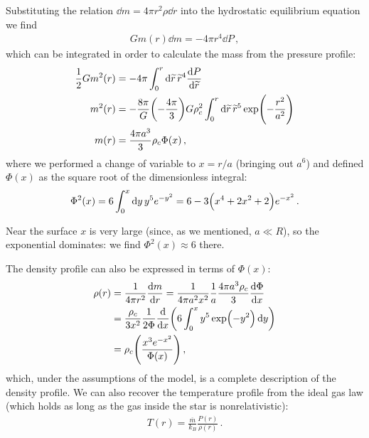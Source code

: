 \documentclass[main.tex]{subfiles}
\begin{document}
Substituting the relation \(\dd{m} = 4 \pi r^2\rho \dd{r}\) into the hydrostatic equilibrium equation we find
%
\begin{align}
  G m(r) \dd{m} = - 4 \pi r^{4} \dd{P}
\,,
\end{align}
%
which can be integrated in order to calculate the mass from the pressure profile: 
%
\begin{align}
  \frac{1}{2} G m^2(r) &= - 4 \pi \int_{0}^{r} \dd{\widetilde{r}} \widetilde{r}^{4} \dv{P}{\widetilde{r}} \\
  m^2(r) &= - \frac{8 \pi }{G} \qty(- \frac{4 \pi }{3}) G \rho_c^2 \int_{0}^{r} \dd{\widetilde{r}} \widetilde{r}^{5} \exp(- \frac{r^2}{a^2})\\
  m(r) &=  \frac{4 \pi a^3}{3} \rho_c \Phi (x)
\,,
\end{align}
%
where we performed a change of variable to \(x = r/a\) (bringing out \(a^{6}\)) and defined \(\Phi (x)\) as the square root of the dimensionless integral: 
%
\begin{align}
  \Phi^2 (x) = 6 \int_{0}^{x} \dd{y} y^{5} e^{-y^2} 
  = 6 - 3 \qty(x^4 +2 x^2+2) e^{-x^2}
\,.
\end{align}

Near the surface \(x\) is very large (since, as we mentioned, \(a \ll R\)), so the exponential dominates: we find \(\Phi^2(x) \approx 6\) there.

The density profile can also be expressed in terms of \(\Phi (x)\):
%
\begin{align}
  \rho (r) &= \frac{1}{4 \pi r^2} \dv{m}{r}
  = \frac{1}{4 \pi a^2 x^2} \frac{1}{a} \frac{4 \pi a^3\rho _c}{3} \dv{\Phi }{x}  \\
  &=\frac{\rho _c}{3 x^2} \frac{1}{2 \Phi} \dv{}{x} \qty( 6\int_0^{x}  y^{5} \exp(-y^2) \dd{y})
  \\
  &= \rho_{c} \qty(\frac{x^3 e^{-x^2}}{\Phi (x)})
\,,
\end{align}
%
which, under the assumptions of the model, is a complete description of the density profile.
We can also recover the temperature profile from the ideal gas law (which holds as long as the gas inside the star is nonrelativistic): 
%
\begin{align}
  T(r) = \frac{\overline{m}}{k_B} \frac{P(r)}{\rho (r)}
\,.
\end{align}
\end{document}
